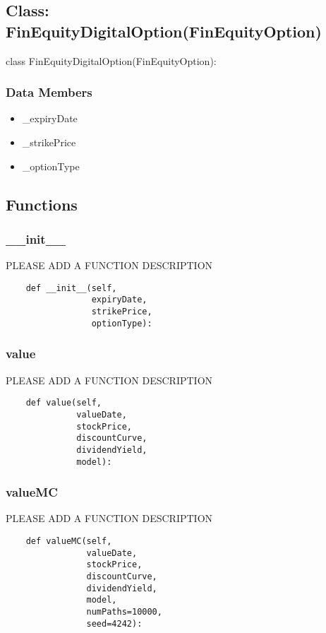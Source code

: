 \documentclass[twoside,11pt]{book}
\begin{document}
\subsection*{Class: FinEquityDigitalOption(FinEquityOption)}
class FinEquityDigitalOption(FinEquityOption): 

\subsubsection*{Data Members}
\begin{itemize}
\item{\_expiryDate}
\item{\_strikePrice}
\item{\_optionType}
\end{itemize}

\subsection*{Functions}

\subsubsection*{{\bf \_\_init\_\_}}
PLEASE ADD A FUNCTION DESCRIPTION

\begin{lstlisting}
    def __init__(self,
                 expiryDate,
                 strikePrice,
                 optionType):
\end{lstlisting}

\subsubsection*{{\bf value}}
PLEASE ADD A FUNCTION DESCRIPTION

\begin{lstlisting}
    def value(self,
              valueDate,
              stockPrice,
              discountCurve,
              dividendYield,
              model):
\end{lstlisting}

\subsubsection*{{\bf valueMC}}
PLEASE ADD A FUNCTION DESCRIPTION

\begin{lstlisting}
    def valueMC(self,
                valueDate,
                stockPrice,
                discountCurve,
                dividendYield,
                model,
                numPaths=10000,
                seed=4242):
\end{lstlisting}
\end{document}
